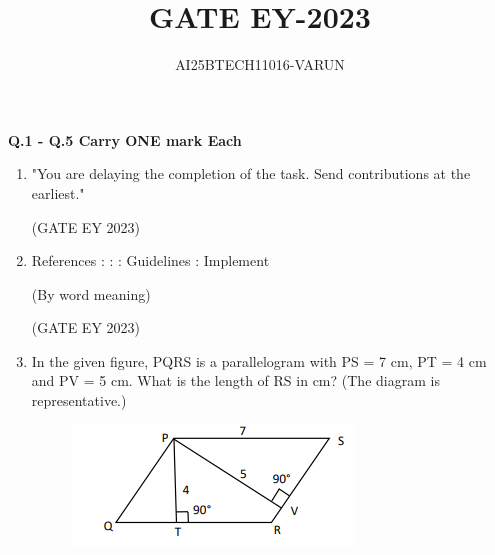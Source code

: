 \documentclass[journal,12pt,onecolumn]{IEEEtran}
\title{GATE EY-2023 }
\author{AI25BTECH11016-VARUN}
\theoremstyle{remark}
\begin{document}
\maketitle
\textbf{Q.1 - Q.5 Carry ONE mark Each}

\begin{enumerate}
    \item "You are delaying the completion of the task. Send  \underline{\hspace{1.5cm}}contributions at the
earliest."

\begin{enumerate}
\end{enumerate}
\hfill{(GATE EY 2023)}

 \item References :\underline{\hspace{1.5cm}} : : Guidelines : Implement

(By word meaning)
\begin{enumerate}
\end{enumerate}
\hfill{(GATE EY 2023)}

 \item In the given figure, PQRS is a parallelogram with PS = 7 cm, PT = 4 cm and
PV = 5 cm. What is the length of RS in cm? (The diagram is representative.)
\begin{figure}[H]
    \centering
    \includegraphics[]{figs/Q.3.png}
    \caption{}
    \label{fig:1}
\end{figure}
\begin{enumerate}
\end{enumerate}
\end{enumerate}
\end{document}
